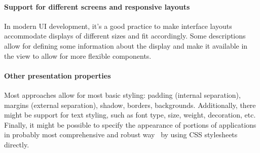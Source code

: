 \paragraph{Support for different screens and responsive layouts}
In modern UI development, it's a good practice to make interface layouts accommodate displays of different sizes and fit accordingly.
Some descriptions allow for defining some information about the display and make it available in the view to allow for more flexible components.

\paragraph{Other presentation properties}

Most approaches allow for most basic styling: padding (internal separation), margins (external separation), shadow, borders, backgrounds.
Additionally, there might be support for text styling, such as font type, size, weight, decoration, etc.
Finally, it might be possible to specify the appearance of portions of applications in probably most comprehensive and robust way \textendash\ by using CSS stylesheets directly.
